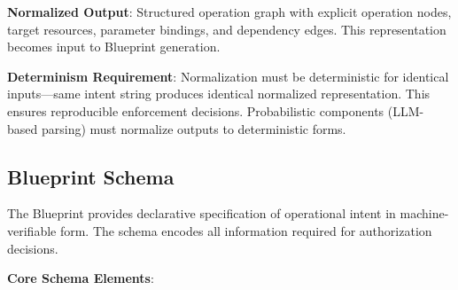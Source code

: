 \documentclass[11pt,letterpaper]{article}
\begin{document}
\textbf{Normalized Output}: Structured operation graph with explicit operation nodes, target resources, parameter bindings, and dependency edges. This representation becomes input to Blueprint generation.

\textbf{Determinism Requirement}: Normalization must be deterministic for identical inputs---same intent string produces identical normalized representation. This ensures reproducible enforcement decisions. Probabilistic components (LLM-based parsing) must normalize outputs to deterministic forms.

\subsection{Blueprint Schema}

The Blueprint provides declarative specification of operational intent in machine-verifiable form. The schema encodes all information required for authorization decisions.

\textbf{Core Schema Elements}:
\end{document}

